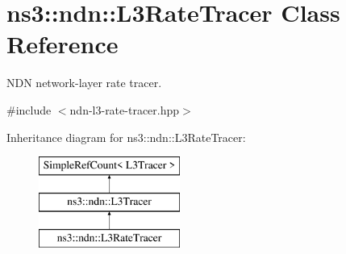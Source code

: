 \hypertarget{classns3_1_1ndn_1_1L3RateTracer}{}\section{ns3\+:\+:ndn\+:\+:L3\+Rate\+Tracer Class Reference}
\label{classns3_1_1ndn_1_1L3RateTracer}


N\+DN network-\/layer rate tracer.  




{\ttfamily \#include $<$ndn-\/l3-\/rate-\/tracer.\+hpp$>$}

Inheritance diagram for ns3\+:\+:ndn\+:\+:L3\+Rate\+Tracer\+:\begin{figure}[H]
\begin{center}
\leavevmode
\includegraphics[height=3.000000cm]{classns3_1_1ndn_1_1L3RateTracer}
\end{center}
\end{figure}
